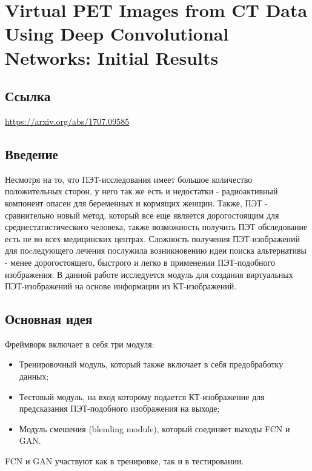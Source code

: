 \section{Virtual PET Images from CT Data Using Deep
Convolutional Networks: Initial Results}

\subsection*{Ссылка}\url{https://arxiv.org/abs/1707.09585}
\subsection*{Введение}
Несмотря на то, что ПЭТ-исследования имеет большое количество положительных 
сторон, у него так же есть и недостатки - радиоактивный компонент опасен 
для беременных и кормящих женщин. Также, ПЭТ - сравнительно новый метод, который все 
еще является дорогостоящим для среднестатистического человека, также возможность получить 
ПЭТ обследование есть не во всех медицинских центрах. Сложность получения ПЭТ-изображений для 
поcледующего лечения послужила возникновению идеи поиска альтернативы - менее дорогостоящего, быстрого 
и легко в применении ПЭТ-подобного изображения. В данной работе исследуется 
модуль для создания виртуальных ПЭТ-изображений на основе информации из КТ-изображений.
\subsection*{Основная идея}
Фреймворк включает в себя три модуля:
\begin{itemize}
    \item Тренировочный модуль, который также включает в себя предобработку данных;
    \item Тестовый модуль, на вход которому подается КТ-изображение для предсказания 
    ПЭТ-подобного изображения на выходе;
    \item Модуль смешения (blending module), который соединяет выходы FCN и GAN.
\end{itemize}
FCN и GAN участвуют как в тренировке, так и в тестировании.

